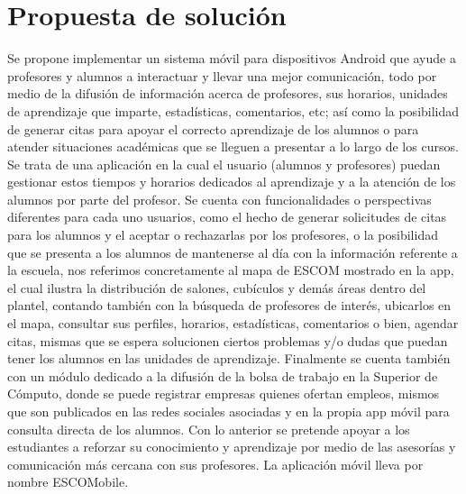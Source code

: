 \newline
\section{Propuesta de solución}

\noindent
Se propone implementar un sistema móvil para dispositivos Android que ayude a profesores y alumnos a interactuar y llevar una mejor 
comunicación, todo por medio de la difusión de información acerca de profesores, sus horarios, unidades de aprendizaje que imparte, estadísticas, comentarios, etc; así como la posibilidad de generar citas para apoyar el correcto aprendizaje de los 
alumnos o para atender situaciones académicas que se lleguen a presentar a lo largo de los cursos.
\newline
\newline
Se trata de una aplicación en la cual el usuario (alumnos y profesores) puedan gestionar estos tiempos y horarios dedicados al aprendizaje y a la atención de los alumnos por parte del profesor. Se cuenta con funcionalidades o perspectivas diferentes para cada uno usuarios, como
el hecho de generar solicitudes de citas para los alumnos y el aceptar o rechazarlas por los profesores, o la posibilidad que se presenta a los alumnos de mantenerse al día con la información referente a la escuela, nos referimos concretamente al mapa de ESCOM mostrado en la app, el cual ilustra la distribución de salones, cubículos y demás áreas dentro del plantel, contando también con la búsqueda de profesores de interés, ubicarlos en el mapa, consultar sus perfiles, horarios, estadísticas, comentarios o bien, agendar citas, mismas que se espera solucionen ciertos problemas y/o dudas que puedan tener los alumnos en las unidades de aprendizaje. Finalmente se cuenta también con un módulo dedicado a la difusión de la bolsa de trabajo en la Superior de Cómputo, donde se puede registrar empresas quienes ofertan empleos, mismos que son publicados en las redes sociales asociadas y en la propia app móvil para consulta directa de los alumnos.
\newline
\newline
Con lo anterior se pretende apoyar a los estudiantes a reforzar su conocimiento y aprendizaje por medio de las asesorías y comunicación más cercana con sus profesores. La aplicación móvil lleva por nombre ESCOMobile.